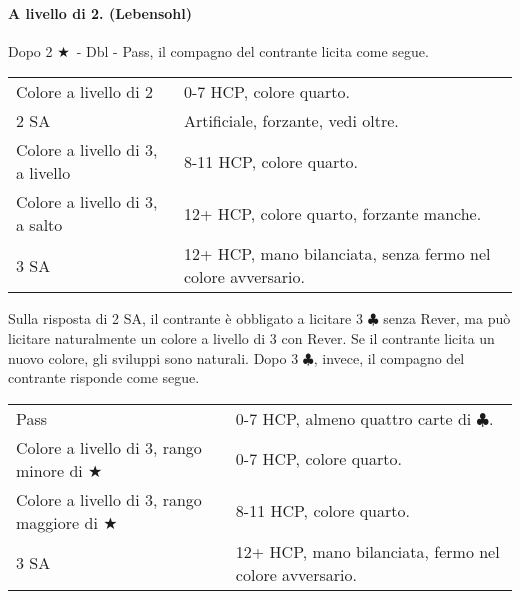 \documentclass[a4paper,10pt]{article}
\renewcommand{\c}{$\clubsuit$\xspace}
\renewcommand{\j}{$\bigstar$\xspace}
\newcommand{\sa}{SA\xspace}
\newcommand{\smallspace}{\vskip0.3cm}
\newenvironment{twocol}
  {\smallspace\noindent\begin{tabular}{l p{0.78\textwidth}}}
  {\end{tabular}\smallspace}
\begin{document}
\paragraph{A livello di 2. (Lebensohl)} Dopo 2 \j\ - Dbl - Pass, il compagno del contrante licita come segue.


\begin{twocol}
	Colore a livello di 2 & 0-7 HCP, colore quarto. \\
	2 \sa & Artificiale, forzante, vedi oltre. \\
	Colore a livello di 3, a livello & 8-11 HCP, colore quarto. \\
	Colore a livello di 3, a salto & 12+ HCP, colore quarto, forzante manche. \\
	3 \sa & 12+ HCP, mano bilanciata, senza fermo nel colore avversario.
\end{twocol}

Sulla risposta di 2 \sa, il contrante è obbligato a licitare 3 \c senza Rever, ma può licitare naturalmente un colore a livello di 3 con Rever. Se il contrante licita un nuovo colore, gli sviluppi sono naturali. Dopo 3 \c, invece, il compagno del contrante risponde come segue.

\begin{twocol}
	Pass & 0-7 HCP, almeno quattro carte di \c. \\
	Colore a livello di 3, rango minore di \j & 0-7 HCP, colore quarto. \\
	Colore a livello di 3, rango maggiore di \j & 8-11 HCP, colore quarto. \\
	3 \sa & 12+ HCP, mano bilanciata, fermo nel colore avversario.
\end{twocol}
\end{document}
